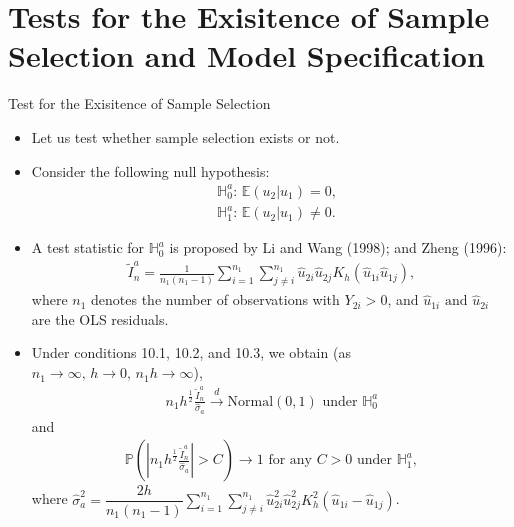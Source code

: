 \documentclass[xcolor=svgnames,dvipdfmx,cjk]{beamer}
\theoremstyle{example}
\def\E{\mathbb{E}}
\def\H{\mathbb{H}}
\def\P{\mathbb{P}}
\def\darrow{\xrightarrow{d}}
\begin{document}
\section{Tests for the Exisitence of Sample Selection and Model Specification}

\begin{frame}{Test for the Exisitence of Sample Selection}
      \begin{itemize}
            \item Let us test whether sample selection exists or not.
            \item Consider the following null hypothesis:
                  \begin{align*}
                        &\H_{0}^a: \, \E(u_2|u_1) = 0, \\
                        &\H_{1}^a: \, \E(u_2|u_1) \neq 0.
                  \end{align*}
            \item A test statistic for $\H_{0}^a$ is proposed 
                  by Li and Wang (1998); and Zheng (1996):
                  \begin{align*}
                        \tilde{I}_n^a 
                              = \frac{1}{n_1 (n_1 - 1)}
                                \sum_{i=1}^{n_1} \sum_{j \neq i}^{n_1}
                                \hat{u}_{2i} \hat{u}_{2j} K_h (\hat{u}_{1i} \hat{u}_{1j}),
                  \end{align*}
                  where $n_1$ denotes the number of observations with $Y_{2i} > 0$, and 
                  $\hat{u}_{1i} \text{ and } \hat{u}_{2i}$ are the OLS residuals.
      \end{itemize}
\end{frame}

\begin{frame}
      \begin{itemize}
            \item Under conditions 10.1, 10.2, and 10.3, we obtain 
                  (as $n_1 \to \infty, \, h \to 0,\, n_1 h \to \infty$),
                  \begin{align*}
                        n_1 h^{\frac{1}{2}}\frac{\tilde{I}_n^a}{\hat{\sigma}_a} \darrow \text{Normal} (0,1) \text{ under } \H_{0}^a
                  \end{align*}
                  and 
                  \begin{align*}
                        \P \left(
                              \left|
                                    n_1 h^{\frac{1}{2}}\frac{\tilde{I}_n^a}{\hat{\sigma}_a}  
                              \right| > C
                        \right) \to 1 \text{ for any } C>0 \text{ under } \H_{1}^a,
                  \end{align*}
                  where $\hat{\sigma}_a^2 
                              = \dfrac{2h}{n_1(n_1 - 1)}
                                \sum_{i=1}^{n_1} \sum_{j \neq i}^{n_1}
                                \hat{u}_{2i}^2 \hat{u}_{2j}^2 K_h^2 (\hat{u}_{1i} - \hat{u}_{1j})$.
      \end{itemize}
\end{frame}
\end{document}

